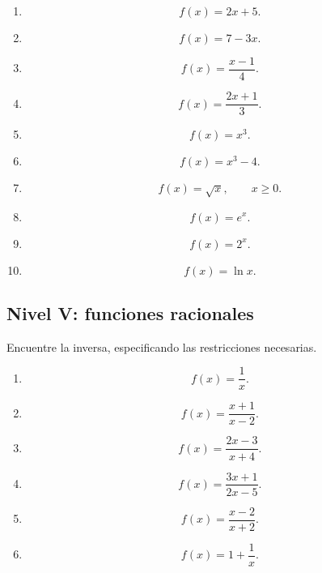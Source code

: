 \documentclass[12pt]{article}
\theoremstyle{remark}
\begin{document}
\begin{enumerate}
    \item
    \[
    f(x)=2x+5.
    \]

    \item
    \[
    f(x)=7-3x.
    \]

    \item
    \[
    f(x)=\frac{x-1}{4}.
    \]

    \item
    \[
    f(x)=\frac{2x+1}{3}.
    \]

    \item
    \[
    f(x)=x^3.
    \]

    \item
    \[
    f(x)=x^3-4.
    \]

    \item
    \[
    f(x)=\sqrt{x},
    \qquad x\geq0.
    \]

    \item
    \[
    f(x)=e^x.
    \]

    \item
    \[
    f(x)=2^x.
    \]

    \item
    \[
    f(x)=\ln x.
    \]
\end{enumerate}

\subsection{Nivel V: funciones racionales}

Encuentre la inversa, especificando las restricciones necesarias.

\begin{enumerate}
    \item
    \[
    f(x)=\frac{1}{x}.
    \]

    \item
    \[
    f(x)=\frac{x+1}{x-2}.
    \]

    \item
    \[
    f(x)=\frac{2x-3}{x+4}.
    \]

    \item
    \[
    f(x)=\frac{3x+1}{2x-5}.
    \]

    \item
    \[
    f(x)=\frac{x-2}{x+2}.
    \]

    \item
    \[
    f(x)=1+\frac{1}{x}.
    \]
\end{enumerate}
\end{document}
